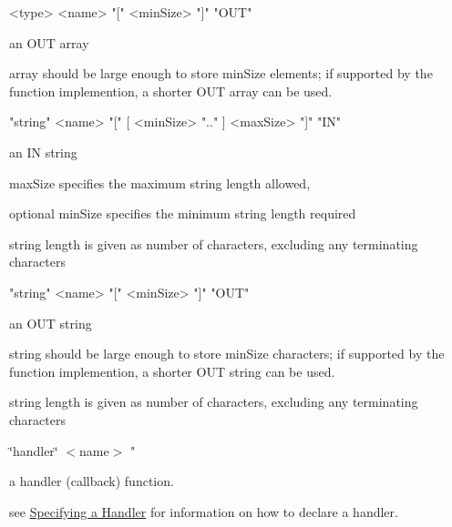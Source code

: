 \begin{DoxyCode}
<type> <name> \textcolor{stringliteral}{"["} <minSize> \textcolor{stringliteral}{"]"} \textcolor{stringliteral}{"OUT"} 
\end{DoxyCode}

\begin{DoxyItemize}
\item an O\+U\+T array
\item array should be large enough to store {\ttfamily min\+Size} elements; if supported by the function implemention, a shorter O\+U\+T array can be used.
\end{DoxyItemize}


\begin{DoxyCode}
\textcolor{stringliteral}{"string"} <name> \textcolor{stringliteral}{"["} [ <minSize> \textcolor{stringliteral}{".."} ] <maxSize> \textcolor{stringliteral}{"]"} \textcolor{stringliteral}{"IN"} 
\end{DoxyCode}

\begin{DoxyItemize}
\item an I\+N string
\item {\ttfamily max\+Size} specifies the maximum string length allowed,
\item optional {\ttfamily min\+Size} specifies the minimum string length required
\item string length is given as number of characters, excluding any terminating characters
\end{DoxyItemize}


\begin{DoxyCode}
\textcolor{stringliteral}{"string"} <name> \textcolor{stringliteral}{"["} <minSize> \textcolor{stringliteral}{"]"} \textcolor{stringliteral}{"OUT"} 
\end{DoxyCode}

\begin{DoxyItemize}
\item an O\+U\+T string
\item string should be large enough to store {\ttfamily min\+Size} characters; if supported by the function implemention, a shorter O\+U\+T string can be used.
\item string length is given as number of characters, excluding any terminating characters
\end{DoxyItemize}

{\ttfamily  \char`\"{}handler\char`\"{} $<$name$>$ "}
\begin{DoxyItemize}
\item a handler (callback) function.
\item see \hyperlink{interface_def_lang_syntax_interfaceDefLangSyntax_handler}{Specifying a Handler} for information on how to declare a handler.
\end{DoxyItemize}

